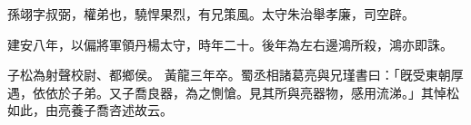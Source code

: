 \begin{pinyinscope}
 
 
 孫翊字叔弼，權弟也，驍悍果烈，有兄策風。太守朱治舉孝廉，司空辟。
 
 
 建安八年，以偏將軍領丹楊太守，時年二十。後年為左右邊鴻所殺，鴻亦即誅。
 
 
子松為射聲校尉、都鄉侯。
 黃龍三年卒。蜀丞相諸葛亮與兄瑾書曰：「旣受東朝厚遇，依依於子弟。又子喬良器，為之惻愴。見其所與亮器物，感用流涕。」其悼松如此，由亮養子喬咨述故云。
 
 
\end{pinyinscope}